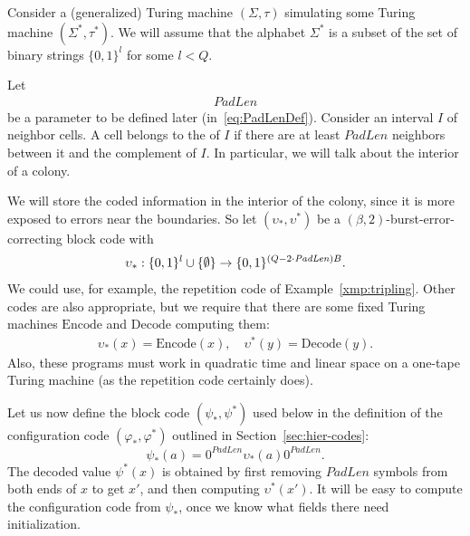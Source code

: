 \documentclass[11pt]{memoir}
\theoremstyle{definition} %
\def\B{B}
\newcommand{\Q}{Q} %
\newcommand{\Decode}{\mathrm{Decode}}
\newcommand{\Encode}{\mathrm{Encode}}
\newcommand{\PadLen}{\mathit{PadLen}} %
\begin{document}
Consider a (generalized) Turing machine 
\( (\Sigma,\tau) \) simulating some Turing machine \( (\Sigma^{*},\tau^{*}) \).
We will assume that the alphabet \( \Sigma^{*} \) is a subset of the set of  binary strings
\( \{0,1\}^{l} \) for some \( l<\Q \).

\begin{definition}[Interior]\label{def:interior}
Let 
\begin{align*}
  \PadLen 
\end{align*}
be a parameter to be defined later (in~\eqref{eq:PadLenDef}).
Consider an interval \( I \) of neighbor cells.
A cell belongs to the  of \( I \) if there are at least \( \PadLen \) neighbors between it 
and the complement of \( I \).
In particular, we will talk about the interior of a colony.
\end{definition}

We will store the coded information in the interior of the colony, since it is more exposed 
to errors near the boundaries.
So let \( (\upsilon_{*}, \upsilon^{*}) \) be a \( (\beta,2) \)-burst-error-correcting block code
with
\begin{align*}
  \upsilon_{*}: \{0,1\}^{l} \cup \set{\emptyset}
   \to\{0,1\}^{(\Q-2\cdot\PadLen)\B}.
\end{align*}
We could use, for example, the repetition code of Example~\ref{xmp:tripling}.
Other codes are also appropriate, but we require that there are some fixed Turing machines
\( \Encode \) and \( \Decode \) computing them:
 \begin{align*}
   \upsilon_{*}(x)=\Encode(x),\quad 
   \upsilon^{*}(y)=\Decode( y).
 \end{align*}
Also, these programs must work in quadratic time and linear space on a one-tape
Turing machine (as the repetition code certainly does).

Let us now define the block code \( (\psi_{*}, \psi^{*}) \) used below in the
definition of the configuration code \( (\varphi_{*}, \varphi^{*}) \)  
outlined in Section~\ref{sec:hier-codes}:
\begin{equation}\label{eq:psi}
   \psi_{*}(a)  = 0^{\PadLen}\upsilon_{*}(a)0^{\PadLen}.
\end{equation}
The decoded value \( \psi^{*}(x) \) is obtained by first removing \( \PadLen \)
symbols from both ends of \( x \) to get \( x' \), and then computing \(
\upsilon^{*}(x') \).
 It will be easy to compute the configuration code from \( \psi_{*} \),
once we know what fields there need initialization.
\end{document}
